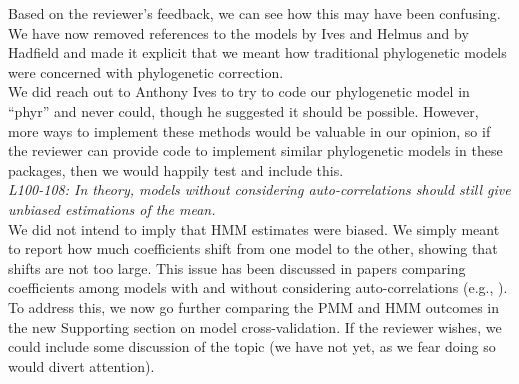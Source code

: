 \documentclass[11pt]{article}
\begin{document}
Based on the reviewer's feedback, we can see how this may have been confusing. We have now removed references to the models by Ives and Helmus and by Hadfield and made it explicit that we meant how traditional phylogenetic models were concerned with phylogenetic correction.\\

We did reach out to Anthony Ives to try to code our phylogenetic model in ``phyr'' and never could, though he suggested it should be possible. However, more ways to implement these methods would be valuable in our opinion, so if the reviewer can provide code to implement similar phylogenetic models in these packages, then we would happily test and include this.\\


\emph{L100-108: In theory, models without considering auto-correlations should still give unbiased estimations of the mean.}\\

We did not intend to imply that HMM estimates were biased. We simply meant to report how much coefficients shift from one model to the other, showing that shifts are not too large. This issue has been discussed in papers comparing coefficients among models with and without considering auto-correlations (e.g., \cite{mauricio2009coefficient}). To address this, we now go further comparing the PMM and HMM outcomes in the new Supporting section on model cross-validation. If the reviewer wishes, we could include some discussion of the topic (we have not yet, as we fear doing so would divert attention). 
\end{document}
